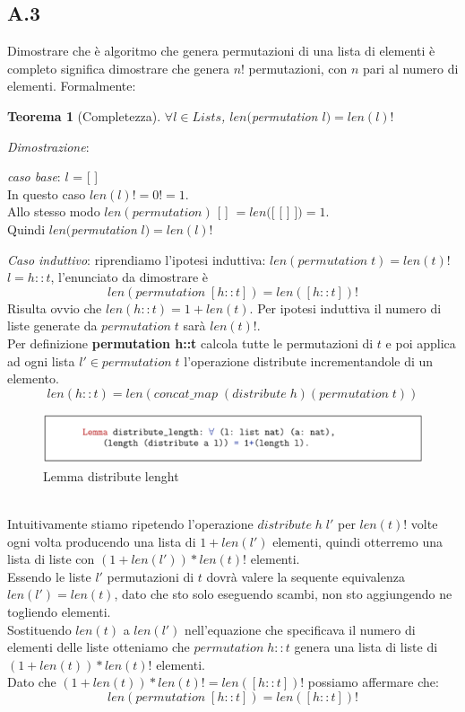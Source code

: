 \documentclass[a4paper]{article}
\newtheorem*{theorem}{Teorema}
\newenvironment{dimostrazione}{\textit{Dimostrazione}:\begin{adjustwidth}{1cm}{}}{\end{adjustwidth}}
\begin{document}
\subsection{A.3}
Dimostrare che è algoritmo che genera permutazioni di una lista di elementi è completo significa dimostrare che genera $n!$ permutazioni, con $n$ pari al numero di elementi. Formalmente:
\begin{theorem}[Completezza] $\forall l \in Lists$, $len($\textit{permutation} $l) = len(l)!$\end{theorem}
\begin{dimostrazione}
	\textit{caso base}: $l$ = [ ]\\
	In questo caso $len(l)! = 0! = 1$.\\
	Allo stesso modo $len(permutation)$ [ ] $= len($[ [ ] ]$) = 1$.\\
	Quindi $len($\textit{permutation} $l) = len(l)!$
	
	\textit{Caso induttivo}: riprendiamo l'ipotesi induttiva: $len(permutation \; t) = len(t)!$
	$l = h::t$, l'enunciato da dimostrare è $$len(permutation \; [h::t]) = len([h::t])!$$
	Risulta ovvio che $len(h::t) = 1 + len(t)$.
	Per ipotesi induttiva il numero di liste generate da $permutation \; t$ sarà $len(t)!$.\\
	Per definizione \textbf{permutation h::t} calcola tutte le permutazioni di $t$ e poi applica ad ogni lista $l' \in permutation \;t$ l'operazione distribute incrementandole di un elemento.
	$$len(h::t) = len(concat\_map \; (distribute \; h) (permutation \; t))$$
\begin{figure}[!ht]
\centering
\includegraphics[width=1\textwidth]{./img/A3_distribute.png}
\caption{Lemma distribute lenght} \label{FIG:A3_distribute}
\end{figure}\\
	Intuitivamente stiamo ripetendo l'operazione $distribute \; h \; l'$ per $len(t) ! $ volte ogni volta producendo una lista di $1 + len(l')$ elementi, quindi otterremo una lista di liste con $(1 + len(l')) * len(t)! $ elementi.\\
	Essendo le liste $l'$ permutazioni di $t$ dovrà valere la sequente equivalenza $len(l') = len(t) $, dato che sto solo eseguendo scambi, non sto aggiungendo ne togliendo elementi.\\
	Sostituendo $len(t)$ a $len(l')$ nell'equazione che specificava il numero di elementi delle liste otteniamo che $permutation  \; h::t$ genera una lista di liste di $(1+len(t)) * len(t)!$ elementi.\\
	Dato che $(1+len(t)) * len(t)! = len([h::t])!$ possiamo affermare che: %
	$$len(permutation \; [h::t]) = len([h::t])!$$
\end{dimostrazione}
\end{document}
